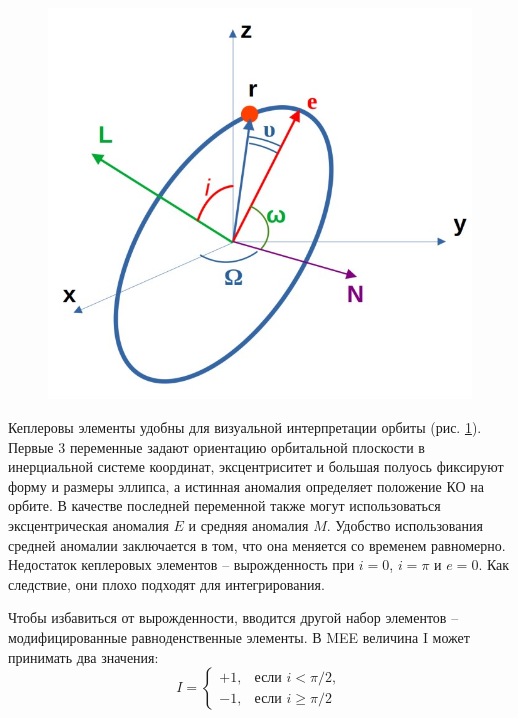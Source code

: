 \begin{figure}[h!]
    \centering
    \includegraphics[width=0.6\linewidth]{../images/review/kepler.jpg}
    \label{fig:kepler}
\end{figure}

Кеплеровы элементы удобны для визуальной интерпретации орбиты (рис. \ref{fig:kepler}).
Первые 3 переменные задают ориентацию орбитальной плоскости в инерциальной системе координат,
эксцентриситет и большая полуось фиксируют форму и размеры эллипса, а истинная аномалия определяет положение КО на орбите.
В качестве последней переменной также могут использоваться эксцентрическая аномалия $E$ и средняя аномалия $M$.
Удобство использования средней аномалии заключается в том, что она меняется со временем равномерно.
Недостаток кеплеровых элементов -- вырожденность при $i = 0$, $i = \pi$ и $e = 0$.
Как следствие, они плохо подходят для интегрирования.

Чтобы избавиться от вырожденности, вводится другой набор элементов -- модифицированные равноденственные элементы.
В MEE величина I может принимать два значения:
\[
I = \left\{
\begin{array}{ll}
+1, & \text{если } i < \pi / 2, \\
-1, & \text{если } i \ge \pi / 2
\end{array}
\right.
\]

